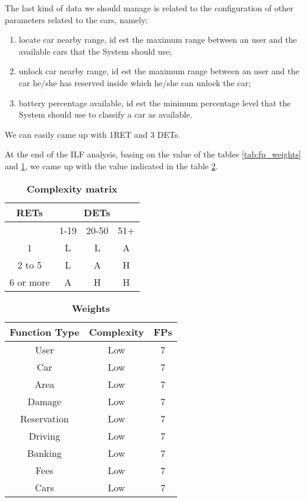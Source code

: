 The last kind of data we should manage is related to the configuration of other parameters related to the cars, namely:
\begin{enumerate}
	\item locate car nearby range, id est the maximum range between an user and the available cars that the System should use;
	\item unlock car nearby range, id est the maximum range between an user and the car he/she has reserved inside which he/she can unlock the car;
	\item battery percentage available, id est the minimum percentage level that the System should use to classify a car as available.
\end{enumerate}
We can easily came up with 1RET and 3 DETs.
\bigskip

At the end of the ILF analysis, basing on the value of the tables \ref{tab:fp_weights} and \ref{tab:ilf_complexity_matrix}, we came up with the value indicated in the table \ref{tab:ilf_weights}.

\begin{longtable}{| c | c | c | c |}
	\caption{\textbf{Complexity matrix}} %
	\label{tab:ilf_complexity_matrix}%
	\\ \hline %
	
	\textbf{RETs} &	\multicolumn{3}{c|}{\textbf{DETs}} \\ \hline
	  & 1-19 & 20-50 & 51+\\ \hline 
	1 & L & L & A\\ \hline 
	2 to 5 & L & A & H\\ \hline 
	6 or more & A & H & H \\ \hline 
	
\end{longtable}

\begin{longtable}{| c | c | c |}
	\caption{\textbf{Weights}} %
	\label{tab:ilf_weights}%
	\\ \hline %
	
	\textbf{Function Type} & \textbf{Complexity} & \textbf{FPs}\\ \hline
	User & Low & 7\\ \hline
	Car & Low & 7\\ \hline
	Area & Low & 7\\ \hline
	Damage & Low & 7\\ \hline
	Reservation & Low & 7\\ \hline
	Driving & Low & 7\\ \hline
	Banking & Low & 7\\ \hline
	Fees & Low & 7\\ \hline
	Cars & Low & 7\\ \hline
\end{longtable}


